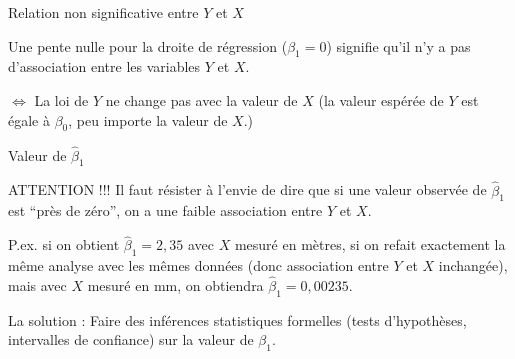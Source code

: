 \documentclass{BeamerTemplate}
\begin{document}
\begin{frame}[t]{Relation non significative entre $Y$ et $X$}

Une \alert{pente nulle pour la droite de régression ($\beta_1=0$) signifie qu'il n'y a pas d'association entre les variables $Y$ et $X$}.
\medskip

$\Leftrightarrow$ La loi de $Y$ ne change pas avec la valeur de $X$ (la valeur espérée de $Y$ est égale à
$\beta_0$, peu importe la valeur de $X$.)


\begin{center}
\end{center}

\end{frame}

\begin{frame}[t]{Valeur de $\hat{\beta}_1$}

ATTENTION !!! Il faut résister à l'envie de dire que si
une valeur observée de $\hat{\beta}_1$ est ``près de zéro'',
on a une faible association entre $Y$ et $X$. 

P.ex. si on obtient $\hat{\beta}_1=2,35$
avec $X$ mesuré en mètres, si on refait exactement la même analyse avec
les mêmes données (donc association entre $Y$ et $X$ inchangée), mais avec $X$ mesuré en mm, on obtiendra $\hat{\beta}_1=0,00235$.

\medskip
La solution : Faire des inférences statistiques formelles (tests d'hypothèses, intervalles de confiance)
sur la valeur de $\beta_1$.
\end{frame}
\end{document}
